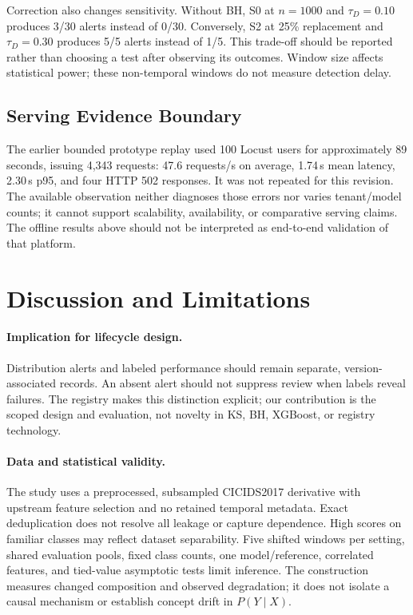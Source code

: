 \documentclass[runningheads]{llncs}
\begin{document}
Correction also changes sensitivity. Without BH, S0 at $n=1000$ and $\tau_D=0.10$ produces 3/30 alerts instead of 0/30. Conversely, S2 at 25\% replacement and $\tau_D=0.30$ produces 5/5 alerts instead of 1/5. This trade-off should be reported rather than choosing a test after observing its outcomes. Window size affects statistical power; these non-temporal windows do not measure detection delay.

\subsection{Serving Evidence Boundary}
The earlier bounded prototype replay used 100 Locust users for approximately 89 seconds, issuing 4,343 requests: 47.6 requests/s on average, 1.74\,s mean latency, 2.30\,s p95, and four HTTP 502 responses. It was not repeated for this revision. The available observation neither diagnoses those errors nor varies tenant/model counts; it cannot support scalability, availability, or comparative serving claims. The offline results above should not be interpreted as end-to-end validation of that platform.

\section{Discussion and Limitations}
\label{sec:discussion}
\paragraph{Implication for lifecycle design.}
Distribution alerts and labeled performance should remain separate, version-associated records. An absent alert should not suppress review when labels reveal failures. The registry makes this distinction explicit; our contribution is the scoped design and evaluation, not novelty in KS, BH, XGBoost, or registry technology.

\paragraph{Data and statistical validity.}
The study uses a preprocessed, subsampled CICIDS2017 derivative with upstream feature selection and no retained temporal metadata. Exact deduplication does not resolve all leakage or capture dependence. High scores on familiar classes may reflect dataset separability. Five shifted windows per setting, shared evaluation pools, fixed class counts, one model/reference, correlated features, and tied-value asymptotic tests limit inference. The construction measures changed composition and observed degradation; it does not isolate a causal mechanism or establish concept drift in $P(Y\mid X)$.
\end{document}
